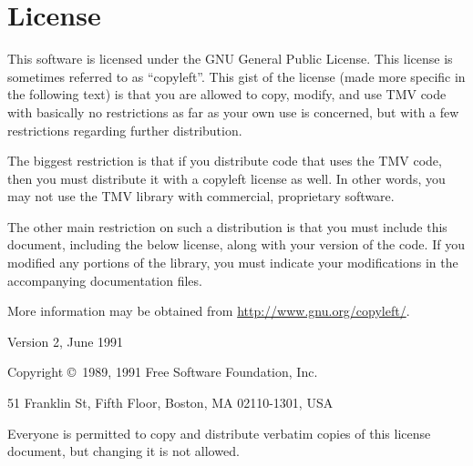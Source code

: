 \documentclass[twoside,letterpaper,11pt]{article}
\begin{document}
\newpage
\section{License}
\label{License}

This software is licensed under the GNU General Public License.  This license is
sometimes referred to as ``copyleft''.  This gist of the license (made more specific
in the following text) is that you are allowed to copy, modify, and use TMV code
with basically no restrictions as far as your own use is concerned, 
but with a few restrictions regarding further distribution.

The biggest restriction is that if you distribute code that
uses the TMV code, then you must distribute it with a copyleft license as well.
In other words, you may not use the TMV library with commercial, proprietary 
software. 

The other main restriction on such a distribution is that you must include this 
document,
including the below license, along with your version of the code.  If you modified
any portions of the library, you must indicate your modifications in the accompanying
documentation files.

More information may be obtained from \url{http://www.gnu.org/copyleft/}.

\begin{center}
{\parindent 0in

Version 2, June 1991

Copyright \copyright\ 1989, 1991 Free Software Foundation, Inc.

\bigskip

51 Franklin St, Fifth Floor, Boston, MA  02110-1301, USA

\bigskip

Everyone is permitted to copy and distribute verbatim copies
of this license document, but changing it is not allowed.
}
\end{center}
\end{document}
